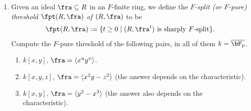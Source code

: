 \documentclass[12pt]{amsart}
\numberwithin{equation}{theorem}
\renewcommand{\:}{\colon}
\theoremstyle{theorem}
\begin{document}
\begin{enumerate}[label=(\arabic*)]
    \vskip 3pt
    \noindent
    {\bf Remark.} A ring is called \emph{$F$-pure} if the Frobenius map $R \to F_* R$ is pure.  Because of this, and because most rings we study are $F$-finite, the terms $F$-pure or $F$-split are usually synonymous.
\item Given an ideal $\fra \subseteq R$ in an $F$-finite ring, we define the \emph{$F$-split (or $F$-pure) threshold $\fpt(R, \fra)$ of $(R, \fra)$} to be
\[
\fpt(R, \fra) := \{ t \geq 0\;|\; (R, \fra^t) \text{ is sharply $F$-split} \}.
\]
Compute the $F$-pure threshold of the following pairs, in all of them $k = \overline{\bF_p}$.
\begin{enumerate}
\item $k[x,y]$, $\fra = \langle x^u y ^v \rangle$.
\item $k[x,y,z]$, $\fra = \langle x^2 y - z^2 \rangle$ (the answer depends on the characteristic).
\item $k[x,y]$, $\fra = \langle y^2 - x^3 \rangle$ (the answer also depends on the characteristic).
\end{enumerate}
\end{enumerate}
\end{document}
